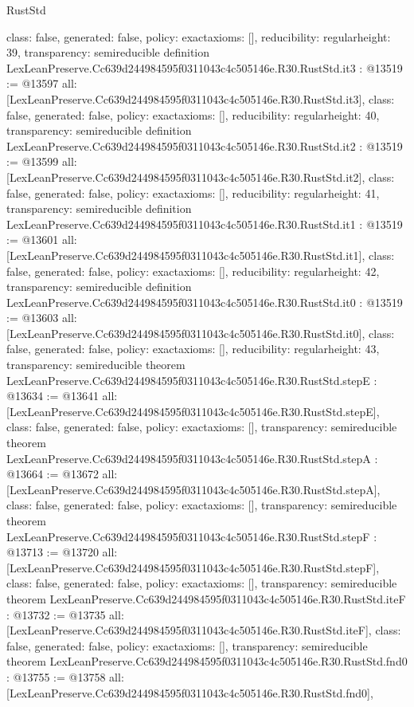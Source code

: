 \begin{lexlean}{RustStd}
\begin{coremodule}
{  class: false,
  generated: false,
  policy: exact{axioms: []},
  reducibility: regular{height: 39},
  transparency: semireducible
}
definition LexLeanPreserve.Cc639d244984595f0311043c4c505146e.R30.RustStd.it3 : @13519 := @13597 {
  all: [LexLeanPreserve.Cc639d244984595f0311043c4c505146e.R30.RustStd.it3],
  class: false,
  generated: false,
  policy: exact{axioms: []},
  reducibility: regular{height: 40},
  transparency: semireducible
}
definition LexLeanPreserve.Cc639d244984595f0311043c4c505146e.R30.RustStd.it2 : @13519 := @13599 {
  all: [LexLeanPreserve.Cc639d244984595f0311043c4c505146e.R30.RustStd.it2],
  class: false,
  generated: false,
  policy: exact{axioms: []},
  reducibility: regular{height: 41},
  transparency: semireducible
}
definition LexLeanPreserve.Cc639d244984595f0311043c4c505146e.R30.RustStd.it1 : @13519 := @13601 {
  all: [LexLeanPreserve.Cc639d244984595f0311043c4c505146e.R30.RustStd.it1],
  class: false,
  generated: false,
  policy: exact{axioms: []},
  reducibility: regular{height: 42},
  transparency: semireducible
}
definition LexLeanPreserve.Cc639d244984595f0311043c4c505146e.R30.RustStd.it0 : @13519 := @13603 {
  all: [LexLeanPreserve.Cc639d244984595f0311043c4c505146e.R30.RustStd.it0],
  class: false,
  generated: false,
  policy: exact{axioms: []},
  reducibility: regular{height: 43},
  transparency: semireducible
}
theorem LexLeanPreserve.Cc639d244984595f0311043c4c505146e.R30.RustStd.stepE : @13634 := @13641 {
  all: [LexLeanPreserve.Cc639d244984595f0311043c4c505146e.R30.RustStd.stepE],
  class: false,
  generated: false,
  policy: exact{axioms: []},
  transparency: semireducible
}
theorem LexLeanPreserve.Cc639d244984595f0311043c4c505146e.R30.RustStd.stepA : @13664 := @13672 {
  all: [LexLeanPreserve.Cc639d244984595f0311043c4c505146e.R30.RustStd.stepA],
  class: false,
  generated: false,
  policy: exact{axioms: []},
  transparency: semireducible
}
theorem LexLeanPreserve.Cc639d244984595f0311043c4c505146e.R30.RustStd.stepF : @13713 := @13720 {
  all: [LexLeanPreserve.Cc639d244984595f0311043c4c505146e.R30.RustStd.stepF],
  class: false,
  generated: false,
  policy: exact{axioms: []},
  transparency: semireducible
}
theorem LexLeanPreserve.Cc639d244984595f0311043c4c505146e.R30.RustStd.iteF : @13732 := @13735 {
  all: [LexLeanPreserve.Cc639d244984595f0311043c4c505146e.R30.RustStd.iteF],
  class: false,
  generated: false,
  policy: exact{axioms: []},
  transparency: semireducible
}
theorem LexLeanPreserve.Cc639d244984595f0311043c4c505146e.R30.RustStd.fnd0 : @13755 := @13758 {
  all: [LexLeanPreserve.Cc639d244984595f0311043c4c505146e.R30.RustStd.fnd0],
}
\end{coremodule}
\end{lexlean}
